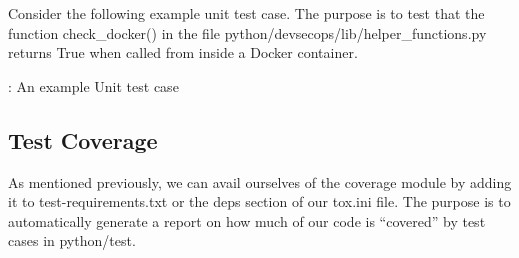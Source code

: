 \justify{}
Consider the following example unit test case. The purpose is to test
that the function check\_docker() in the file python/devsecops/lib/helper\_functions.py 
returns True when called from inside a Docker container.

\begin{mybox}{\thetcbcounter: An example Unit test case}
  
\end{mybox}

\subsection{Test Coverage}

\justify{}
As mentioned previously, we can avail ourselves of the coverage module by adding it to test-requirements.txt or the deps section of our tox.ini file.
The purpose is to automatically generate a report on how much of our code is ``covered'' by test cases in python/test.


